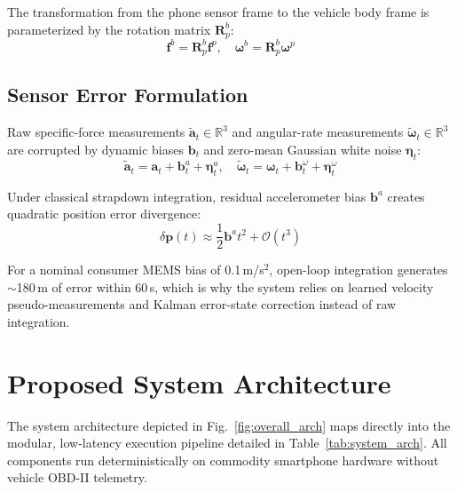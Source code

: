 \documentclass[conference]{IEEEtran}
\begin{document}
The transformation from the phone sensor frame to the vehicle body frame is parameterized by the rotation matrix $\mathbf{R}_p^b$:
\begin{equation}
\mathbf{f}^b = \mathbf{R}_p^b \mathbf{f}^p, \quad \boldsymbol{\omega}^b = \mathbf{R}_p^b \boldsymbol{\omega}^p
\end{equation}

\subsection{Sensor Error Formulation}

Raw specific-force measurements $\tilde{\mathbf{a}}_t \in \mathbb{R}^3$ and angular-rate measurements $\tilde{\boldsymbol{\omega}}_t \in \mathbb{R}^3$ are corrupted by dynamic biases $\mathbf{b}_t$ and zero-mean Gaussian white noise $\boldsymbol{\eta}_t$:
\begin{equation}
\tilde{\mathbf{a}}_t = \mathbf{a}_t + \mathbf{b}_t^a + \boldsymbol{\eta}_t^a, \quad \tilde{\boldsymbol{\omega}}_t = \boldsymbol{\omega}_t + \mathbf{b}_t^{\omega} + \boldsymbol{\eta}_t^{\omega}
\end{equation}

Under classical strapdown integration, residual accelerometer bias $\mathbf{b}^a$ creates quadratic position error divergence:
\begin{equation}
\delta \mathbf{p}(t) \approx \frac{1}{2} \mathbf{b}^a t^2 + \mathcal{O}(t^3)
\end{equation}

For a nominal consumer MEMS bias of 0.1\,m/s$^2$, open-loop integration generates $\sim$180\,m of error within 60\,s, which is why the system relies on learned velocity pseudo-measurements and Kalman error-state correction instead of raw integration.

\section{Proposed System Architecture}

The system architecture depicted in Fig.~\ref{fig:overall_arch} maps directly into the modular, low-latency execution pipeline detailed in Table~\ref{tab:system_arch}. All components run deterministically on commodity smartphone hardware without vehicle OBD-II telemetry.
\end{document}
